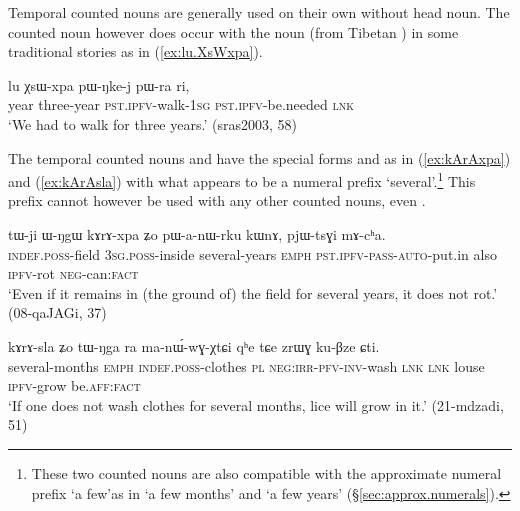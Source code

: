 Temporal counted nouns are generally used on their own without head noun. The counted noun  however does occur with the noun  (from Tibetan ) in some traditional stories as in (\ref{ex:lu.XsWxpa}).

\begin{exe}
\ex \label{ex:lu.XsWxpa}
\gll lu χsɯ-xpa pɯ-ŋke-j pɯ-ra ri, \\
year three-year \textsc{pst}.\textsc{ipfv}-walk-\textsc{1sg} \textsc{pst}.\textsc{ipfv}-be.needed \textsc{lnk} \\
\glt `We had to walk for three years.' (sras2003, 58)
\end{exe} 

The temporal counted nouns  and  have the special forms  and  as in (\ref{ex:kArAxpa}) and (\ref{ex:kArAsla}) with what appears to be a numeral prefix  `several'.\footnote{These two counted nouns are also compatible with the approximate numeral prefix  `a few'as in  `a few months' and  `a few years' (§\ref{sec:approx.numerals}).
} This prefix cannot however be used with any other counted nouns, even . 


\begin{exe}
\ex \label{ex:kArAxpa}
\gll tɯ-ji ɯ-ŋgɯ kɤrɤ-xpa ʑo pɯ-a-nɯ-rku kɯnɤ, pjɯ-tsɣi mɤ-cʰa. \\
\textsc{indef}.\textsc{poss}-field \textsc{3sg}.\textsc{poss}-inside several-years \textsc{emph} \textsc{pst}.\textsc{ipfv}-\textsc{pass}-\textsc{auto}-put.in also \textsc{ipfv}-rot \textsc{neg}-can:\textsc{fact} \\
\glt `Even if it remains in (the ground of) the field for several years, it does not rot.' (08-qaJAGi, 37)
\end{exe}

\begin{exe}
\ex \label{ex:kArAsla}
\gll kɤrɤ-sla ʑo tɯ-ŋga ra ma-nɯ́-wɣ-χtɕi qʰe tɕe zrɯɣ ku-βze ɕti.  \\
several-months \textsc{emph} \textsc{indef}.\textsc{poss}-clothes \textsc{pl} \textsc{neg}:\textsc{irr}-\textsc{pfv}-\textsc{inv}-wash \textsc{lnk} \textsc{lnk} louse \textsc{ipfv}-grow be.\textsc{aff}:\textsc{fact} \\
\glt `If one does not wash clothes for several months, lice will grow in it.' (21-mdzadi, 51)
\end{exe}


